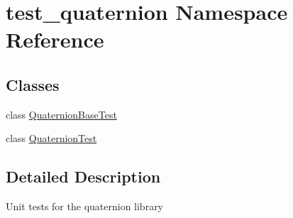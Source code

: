 \hypertarget{namespacetest__quaternion}{}\section{test\+\_\+quaternion Namespace Reference}
\label{namespacetest__quaternion}
\subsection*{Classes}
\begin{DoxyCompactItemize}
\item 
class \mbox{\hyperlink{classtest__quaternion_1_1QuaternionBaseTest}{Quaternion\+Base\+Test}}
\item 
class \mbox{\hyperlink{classtest__quaternion_1_1QuaternionTest}{Quaternion\+Test}}
\end{DoxyCompactItemize}


\subsection{Detailed Description}
\begin{DoxyVerb}Unit tests for the quaternion library
\end{DoxyVerb}
 